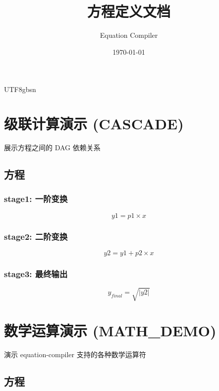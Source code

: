 \documentclass{article}
\title{方程定义文档}
\author{Equation Compiler}
\date{\today}
\begin{document}
\begin{CJK}{UTF8}{gbsn}

\maketitle

\tableofcontents
\newpage

\section{级联计算演示 (CASCADE)}

展示方程之间的 DAG 依赖关系

\subsection{方程}

\subsubsection{stage1: 一阶变换}

\begin{equation}
    y1 = p1 \times x
\end{equation}

\subsubsection{stage2: 二阶变换}

\begin{equation}
    y2 = y1 + p2 \times x
\end{equation}

\subsubsection{stage3: 最终输出}

\begin{equation}
    y_{final} = \sqrt{|y2|}
\end{equation}

\section{数学运算演示 (MATH_DEMO)}

演示 equation-compiler 支持的各种数学运算符

\subsection{方程}


\end{CJK}
\end{document}
